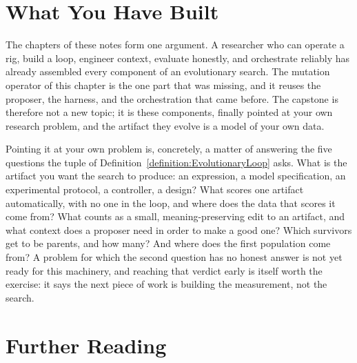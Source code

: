 \section{What You Have Built}
\label{section:WhatYouHaveBuilt}

The chapters of these notes form one argument.
A researcher who can operate a rig, build a loop, engineer context, evaluate honestly, and orchestrate reliably has already assembled every component of an evolutionary search.
The mutation operator of this chapter is the one part that was missing, and it reuses the proposer, the harness, and the orchestration that came before.
The capstone is therefore not a new topic; it is these components, finally pointed at your own research problem, and the artifact they evolve is a model of your own data.

Pointing it at your own problem is, concretely, a matter of answering the five questions the tuple of Definition~\ref{definition:EvolutionaryLoop} asks.
What is the artifact you want the search to produce: an expression, a model specification, an experimental protocol, a controller, a design?
What scores one artifact automatically, with no one in the loop, and where does the data that scores it come from?
What counts as a small, meaning-preserving edit to an artifact, and what context does a proposer need in order to make a good one?
Which survivors get to be parents, and how many?
And where does the first population come from?
A problem for which the second question has no honest answer is not yet ready for this machinery, and reaching that verdict early is itself worth the exercise: it says the next piece of work is building the measurement, not the search.

\section*{Further Reading}

